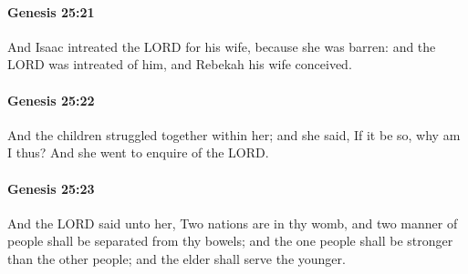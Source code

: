 		\paragraph{Genesis 25:21} %
			\label{GENESIS-25-21}

			And Isaac intreated the LORD for his wife, because she was barren: and the LORD was intreated of him, and Rebekah his wife conceived.


		\paragraph{Genesis 25:22} %
			\label{GENESIS-25-22}

			And the children struggled together within her; and she said, If it be so, why am I thus?  And she went to enquire of the LORD.


		\paragraph{Genesis 25:23} %
			\label{GENESIS-25-23}

			And the LORD said unto her, Two nations are in thy womb, and two manner of people shall be separated from thy bowels; and the one people shall be stronger than the other people; and the elder shall serve the younger.


